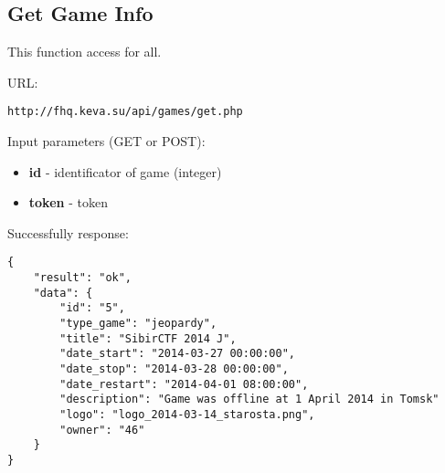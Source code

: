 \subsection{Get Game Info}
\par

This function access for all.

URL:
\begin{Verbatim}[frame=single]
http://fhq.keva.su/api/games/get.php
\end{Verbatim}

Input parameters (GET or POST):
\begin{itemize}
  \item \textbf{id} - identificator of game (integer)
  \item \textbf{token} - token
\end{itemize}

Successfully response:  \\
\begin{Verbatim}[frame=single]
{
    "result": "ok",
    "data": {
        "id": "5",
        "type_game": "jeopardy",
        "title": "SibirCTF 2014 J",
        "date_start": "2014-03-27 00:00:00",
        "date_stop": "2014-03-28 00:00:00",
        "date_restart": "2014-04-01 08:00:00",
        "description": "Game was offline at 1 April 2014 in Tomsk"
        "logo": "logo_2014-03-14_starosta.png",
        "owner": "46"
    }
}
\end{Verbatim}

~
